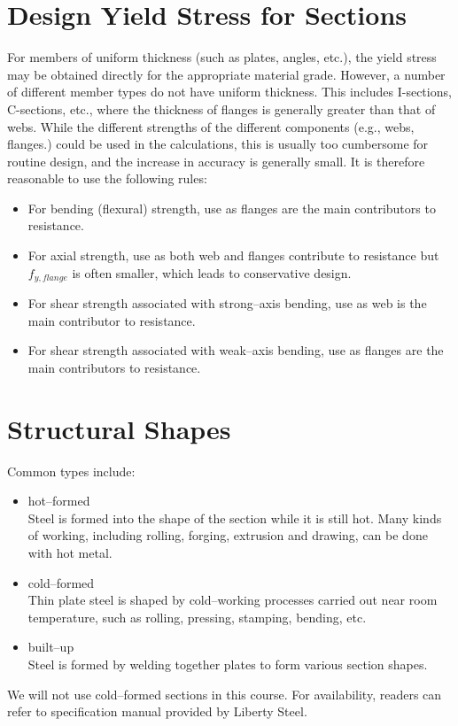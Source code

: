 \section{Design Yield Stress for Sections}\label{sec:ys}
For members of uniform thickness (such as plates, angles, etc.), the yield stress may be obtained directly for the appropriate material grade. However, a number of different member types do not have uniform thickness. This includes I-sections, C-sections, etc., where the thickness of flanges is generally greater than that of webs. While the different strengths of the different components (e.g., webs, flanges.) could be used in the calculations, this is usually too cumbersome for routine design, and the increase in accuracy is generally small. It is therefore reasonable to use the following rules:
\begin{itemize}
\item For bending (flexural) strength, use  as flanges are the main contributors to resistance.
\begin{figure}[H]
\centering

\end{figure}
\item For axial strength, use  as both web and flanges contribute to resistance but $f_{y,flange}$ is often smaller, which leads to conservative design.
\begin{figure}[H]
\centering

\end{figure}
\item For shear strength associated with strong--axis bending, use  as web is the main contributor to resistance.
\begin{figure}[H]
\centering

\end{figure}
\item For shear strength associated with weak--axis bending, use  as flanges are the main contributors to resistance.
\begin{figure}[H]
\centering

\end{figure}
\end{itemize}
\section{Structural Shapes}
Common types include:
\begin{itemize}
\item hot--formed\\Steel is formed into the shape of the section while it is still hot. Many kinds of working, including rolling, forging, extrusion and drawing, can be done with hot metal.
\item cold--formed\\Thin plate steel is shaped by cold--working processes carried out near room temperature, such as rolling, pressing, stamping, bending, etc.
\item built--up\\Steel is formed by welding together plates to form various section shapes.
\end{itemize}
We will not use cold--formed sections in this course. For availability, readers can refer to specification manual provided by Liberty Steel.
